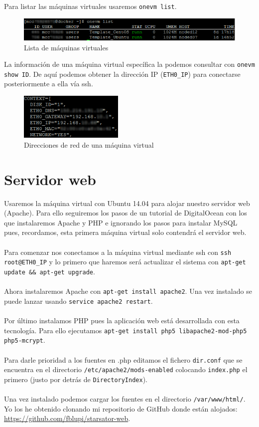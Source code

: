 Para listar las máquinas virtuales usaremos \texttt{onevm list}.

\begin{figure}[H]
	\centering
	\includegraphics[width=14cm]{img/onevm-list}
	\caption{Lista de máquinas virtuales}
	\label{fig:onevm-list}
\end{figure}

La información de una máquina virtual específica la podemos consultar con \texttt{onevm show ID}. De aquí podemos obtener la dirección IP (\texttt{ETH0\_IP}) para conectarse posteriormente a ella vía ssh.

\begin{figure}[H]
	\centering
	\includegraphics[width=5cm]{img/onevm-show-context}
	\caption{Direcciones de red de una máquina virtual}
	\label{fig:onevm-show-context}
\end{figure}

\section{Servidor web}

Usaremos la máquina virtual con Ubuntu 14.04 para alojar nuestro servidor web (Apache). Para ello seguiremos los pasos de un tutorial de DigitalOcean \cite{InstallLAMPUbuntu14.04} con los que instalaremos Apache y PHP e ignorando los pasos para instalar MySQL pues, recordamos, esta primera máquina virtual solo contendrá el servidor web.
\\ \\
Para comenzar nos conectamos a la máquina virtual mediante ssh con \texttt{ssh root@ETH0\_IP} y lo primero que haremos será actualizar el sistema con \texttt{apt-get update \&\& apt-get upgrade}.
\\ \\
Ahora instalaremos Apache con \texttt{apt-get install apache2}. Una vez instalado se puede lanzar usando \texttt{service apache2 restart}.
\\ \\
Por último instalamos PHP pues la aplicación web está desarrollada con esta tecnología. Para ello ejecutamos \texttt{apt-get install php5 libapache2-mod-php5 php5-mcrypt}.
\\ \\
Para darle prioridad a los fuentes en .php editamos el fichero \texttt{dir.conf} que se encuentra en el directorio \texttt{/etc/apache2/mods-enabled} colocando \texttt{index.php} el primero (justo por detrás de \texttt{DirectoryIndex}).
\\ \\
Una vez instalado podemos cargar los fuentes en el directorio \texttt{/var/www/html/}. Yo los he obtenido clonando mi repositorio de GitHub donde están alojados: \url{https://github.com/fblupi/starsator-web}.

